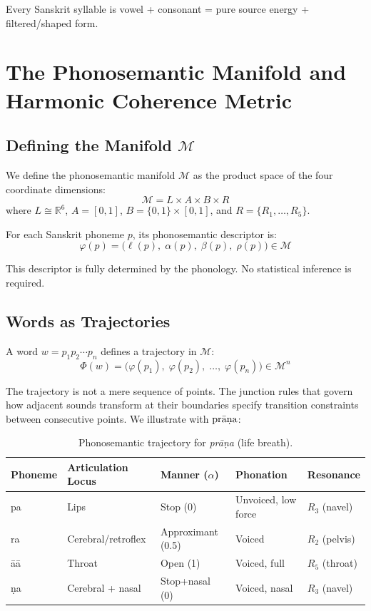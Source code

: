 \documentclass[12pt]{article}
\begin{document}
Every Sanskrit syllable is vowel + consonant = pure source energy + filtered/shaped form.


\section{The Phonosemantic Manifold and Harmonic Coherence Metric}

\subsection{Defining the Manifold $\mathcal{M}$}

We define the phonosemantic manifold $\mathcal{M}$ as the product space of the four coordinate dimensions:
\[
\mathcal{M} = L \times A \times B \times R
\]
where $L \cong \mathbb{R}^6$, $A = [0,1]$, $B = \{0,1\} \times [0,1]$, and $R = \{R_1, \ldots, R_5\}$.

For each Sanskrit phoneme $p$, its phonosemantic descriptor is:
\[
\varphi(p) = \bigl(\ell(p),\; \alpha(p),\; \beta(p),\; \rho(p)\bigr) \in \mathcal{M}
\]

This descriptor is fully determined by the phonology. No statistical inference is required.

\subsection{Words as Trajectories}

A word $w = p_1 p_2 \cdots p_n$ defines a trajectory in $\mathcal{M}$:
\[
\Phi(w) = \bigl(\varphi(p_1),\; \varphi(p_2),\; \ldots,\; \varphi(p_n)\bigr) \in \mathcal{M}^n
\]

The trajectory is not a mere sequence of points. The junction rules that govern how adjacent sounds transform at their boundaries specify transition constraints between consecutive points. We illustrate with $\text{pr\={a}\d{n}a}$:

\begin{table}[htbp]
\centering
\renewcommand{\arraystretch}{1.3}
\begin{tabular}{lllll}
\toprule
\textbf{Phoneme} & \textbf{Articulation Locus} & \textbf{Manner ($\alpha$)} & \textbf{Phonation} & \textbf{Resonance} \\
\midrule
pa & Lips & Stop (0) & Unvoiced, low force & $R_3$ (navel) \\
ra & Cerebral/retroflex & Approximant (0.5) & Voiced & $R_2$ (pelvis) \\
\={a}\={a} & Throat & Open (1) & Voiced, full & $R_5$ (throat) \\
\d{n}a & Cerebral + nasal & Stop+nasal (0) & Voiced, nasal & $R_3$ (navel) \\
\bottomrule
\end{tabular}
\caption{Phonosemantic trajectory for \textit{pr\={a}\d{n}a} (life breath).}
\end{table}
\end{document}
